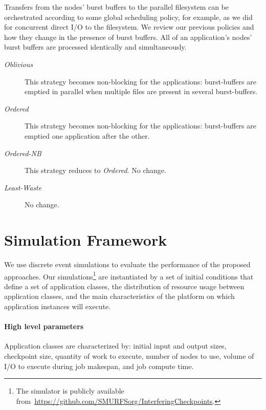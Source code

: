\documentclass[two]{article}
\newcommand{\nocoop}{\emph{Oblivious}\xspace}
\newcommand{\fifoblock}{\emph{Ordered}\xspace}
\newcommand{\fifononblock}{\emph{Ordered-NB}\xspace}
\newcommand{\leastwaste}{\emph{Least-Waste}\xspace}
\begin{document}
Transfers from the nodes' burst buffers to the parallel
filesystem can be orchestrated according to some global scheduling
policy, for example, as we did for concurrent direct I/O to the
filesystem. We review our previous policies and how they change in 
the presence of burst buffers. 
All of an application's nodes' burst buffers are processed identically and
simultaneously.

\begin{description}

\item[\nocoop] This strategy becomes non-blocking for the applications: burst-buffers
  are emptied in parallel when multiple files are present in several burst-buffers.
\item[\fifoblock] This strategy becomes non-blocking for the applications:
  burst-buffers are emptied one application after the other.
\item[\fifononblock] This strategy reduces to \fifoblock. No change.
\item[\leastwaste] No change.
\end{description}


\section{Simulation Framework}
\label{sec:simulator}

We use discrete event simulations to evaluate the performance of the proposed
approaches.  Our simulations\footnote{The simulator is publicly available
from~\url{https://github.com/SMURFSorg/InterferingCheckpoints}.} are instantiated
by a set of initial conditions that define a set of application classes, the
distribution of resource usage between application classes, and the main
characteristics of the platform on which application instances will execute.

\paragraph*{High level parameters}
Application classes are characterized by: initial input and output sizes, checkpoint
size, quantity of work to execute, number of nodes to use, volume of I/O to
execute during job makespan, and job compute time.
\end{document}
